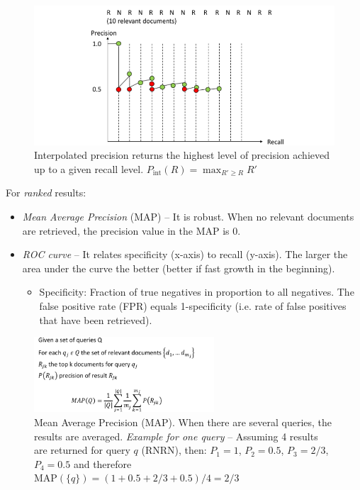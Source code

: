    \begin{figure}[htp]
      \centering
        \includegraphics[width=\textwidth]{images/rrplot2.png}
        \caption{Interpolated precision returns the highest level of precision achieved up to a given recall level. $P_\text{int}(R)=\max_{R'\geq R}{R'}$}
        \label{fig:rrplot2}
    \end{figure}
    For \emph{ranked} results:
    \begin{itemize}
      \item \emph{Mean Average Precision} (MAP) -- It is robust. When no relevant documents are retrieved, the precision value in the MAP is 0.
      \item \emph{ROC curve} -- It relates specificity (x-axis) to recall (y-axis). The larger the area under the curve the better (better if fast growth in the beginning).
      \begin{itemize}
        \item Specificity: Fraction of true negatives in proportion to all negatives. The false positive rate (FPR) equals 1-specificity (i.e. rate of false positives that have been retrieved).
      \end{itemize}
    \end{itemize}
\newpage
    \begin{figure}[htp]
      \centering
        \includegraphics[width=0.6\textwidth]{images/mapmap.png}
        \caption{Mean Average Precision (MAP). When there are several queries, the results are averaged. \emph{Example for one query} -- Assuming 4 results are returned for query $q$ (RNRN), then: $P_1=1$, $P_2=0.5$, $P_3=2/3$, $P_4=0.5$ and therefore $\text{MAP}(\{q\})=(1+0.5+2/3+0.5)/4=2/3$}
        \label{fig:mapmap}
    \end{figure}

